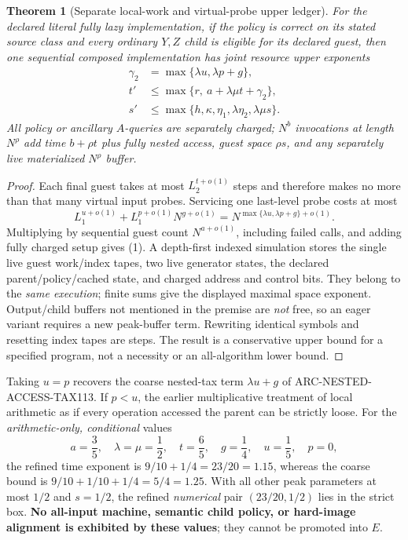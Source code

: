 \documentclass[11pt]{article}
\newtheorem{theorem}{Theorem}
\begin{document}
\begin{theorem}[Separate local-work and virtual-probe upper ledger]
For the declared literal \emph{fully lazy} implementation, if
the policy is correct on its stated source class and every
ordinary \(Y,Z\) child is eligible for its declared guest, then
one sequential composed implementation has joint resource
upper exponents
\[
 \boxed{\begin{aligned}
 \gamma_2&=\max\{\lambda u,\lambda p+g\},\\
 t'&\le\max\{r,\ a+\lambda\mu t+\gamma_2\},\\
 s'&\le\max\{h,\kappa,\eta_1,\lambda\eta_2,
                    \lambda\mu s\}.
 \end{aligned}}\tag{1}
\]
All policy or ancillary \(A\)-queries are separately charged;
\(N^b\) invocations at length \(N^\rho\) add time
\(b+\rho t\) plus fully nested access, guest space \(\rho s\),
and any separately live materialized \(N^\rho\) buffer.
\end{theorem}
\begin{proof}
Each final guest takes at most \(L_2^{t+o(1)}\)
steps and therefore makes no more than that many
virtual input probes. Servicing one last-level probe costs
at most
\[
 L_1^{u+o(1)}
 +L_1^{p+o(1)}N^{g+o(1)}
 =N^{\max\{\lambda u,\lambda p+g\}+o(1)}.
\]
Multiplying by sequential guest count \(N^{a+o(1)}\),
including failed calls, and adding fully charged setup
gives (1). A depth-first indexed simulation stores the
single live guest work/index tapes, two live generator
states, the declared parent/policy/cached state, and
charged address and control bits. They belong to the
\emph{same execution}; finite sums give the displayed
maximal space exponent. Output/child buffers not mentioned
in the premise are \emph{not} free, so an eager variant
requires a new peak-buffer term. Rewriting identical
symbols and resetting index tapes are steps. The
result is a conservative upper bound for a specified
program, not a necessity or an all-algorithm lower bound.
\end{proof}
Taking \(u=p\) recovers the coarse nested-tax term
\(\lambda u+g\) of ARC-NESTED-ACCESS-TAX113.
If \(p<u\), the earlier multiplicative treatment of
local arithmetic as if every operation accessed the parent
can be strictly loose. For the \emph{arithmetic-only,
conditional} values
\[
 a=\frac35,\quad\lambda=\mu=\frac12,\quad
 t=\frac65,\quad g=\frac14,\quad
 u=\frac15,\quad p=0,
\]
the refined time exponent is \(9/10+1/4=23/20=1.15\),
whereas the coarse bound is \(9/10+1/10+1/4=5/4=1.25\).
With all other peak parameters at most \(1/2\) and
\(s=1/2\), the refined \emph{numerical} pair
\((23/20,1/2)\) lies in the strict box.
\textbf{No all-input machine, semantic child policy,
or hard-image alignment is exhibited by these values};
they cannot be promoted into \(E\).
\end{document}
